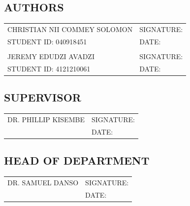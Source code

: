 \documentclass[a4paper,12pt]{article}  %
\begin{document}
\vspace{1cm}

\subsection*{AUTHORS}
\begin{tabular}{l l}
	\vspace{1cm}
    CHRISTIAN NII COMMEY SOLOMON & SIGNATURE: \underline{\hspace{5cm}} \\
    \vspace{1cm}
    STUDENT ID: 040918451 & DATE: \underline{\hspace{5cm}} \\
    & \\
    \vspace{1cm}
    JEREMY EDUDZI AVADZI & SIGNATURE: \underline{\hspace{5cm}} \\
    STUDENT ID: 4121210061 & DATE: \underline{\hspace{5cm}} \\
\end{tabular}

\vspace{1cm}

\subsection*{SUPERVISOR}
\begin{tabular}{l l}
\vspace{1cm}
    DR. PHILLIP KISEMBE & SIGNATURE: \underline{\hspace{5cm}} \\
    & DATE: \underline{\hspace{5cm}} \\
\end{tabular}

\vspace{1cm}

\subsection*{HEAD OF DEPARTMENT}
\begin{tabular}{l l}
\vspace{1cm}
    DR. SAMUEL DANSO & SIGNATURE: \underline{\hspace{5cm}} \\
    & DATE: \underline{\hspace{5cm}} \\
\end{tabular}
\newpage
\tableofcontents
\newpage
\end{document}
